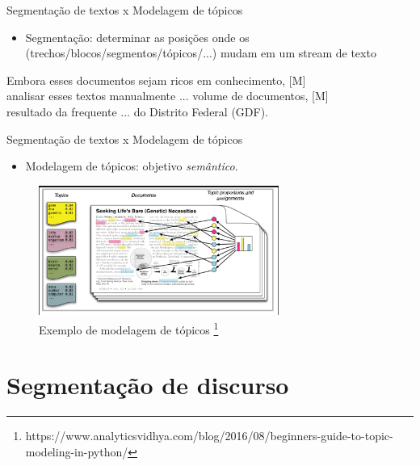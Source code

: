 \documentclass[10pt]{beamer}
\begin{document}
\begin{frame}{Segmentação de textos x Modelagem de tópicos}
    \begin{itemize}
        \item Segmentação: determinar as posições onde os (trechos/blocos/segmentos/tópicos/...) mudam em um stream de texto \cite{BarzilayMIT}
    \end{itemize}
    \begin{example}
        Embora esses documentos sejam ricos em conhecimento, [M] \\
        analisar esses textos manualmente ... volume de documentos, [M] \\
        resultado da frequente ... do Distrito Federal (GDF).
    \end{example}
    \flushright \caption{[M] indica mudança de tópico}
\end{frame}

\begin{frame}{Segmentação de textos x Modelagem de tópicos}
    \begin{itemize}
        \item Modelagem de tópicos: objetivo \emph{semântico}. 
    \end{itemize}
    
    \begin{figure}
        \centering
        \includegraphics[width=0.7\textwidth]{Feathergraphics/topic_model.png}
        \caption{Exemplo de modelagem de tópicos \footnote{https://www.analyticsvidhya.com/blog/2016/08/beginners-guide-to-topic-modeling-in-python/}}
        \label{fig:my_label}
    \end{figure}
    
\end{frame}

\section{Segmentação de discurso}
\end{document}

